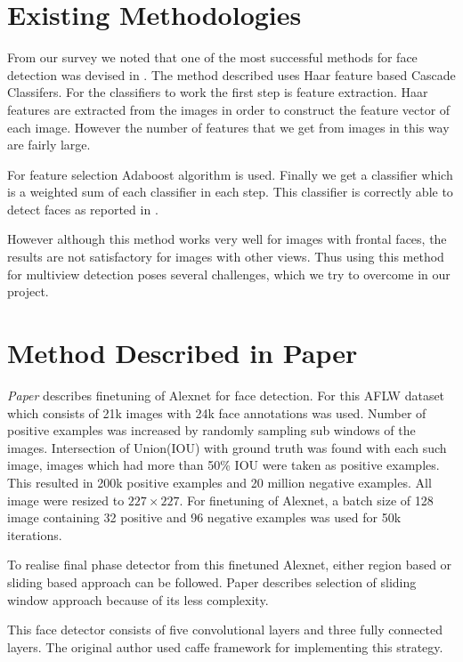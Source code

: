 \documentclass{article}
\begin{document}
\section{Existing Methodologies}
From our survey we noted that one of the most successful methods for face detection was devised in \cite{viola}. The method described uses Haar feature based Cascade Classifers. For the classifiers to work the first step is feature extraction. Haar features are extracted from the images in order to construct the feature vector of each image. However the number of features that we get from images in this way are fairly large.\par
For feature selection Adaboost algorithm is used. Finally we get a classifier which is a weighted sum of each classifier in each step. This classifier is correctly able to detect faces as reported in \cite{viola}. \par
However although this method works very well for images with frontal faces, the results are not satisfactory for images with other views. Thus using this method for multiview detection poses several challenges, which we try to overcome in our project.

\section{Method Described in Paper}
\textit{Paper} describes finetuning of Alexnet for face detection. For this AFLW dataset which consists of 21k images with 24k face annotations was used. Number of positive examples was increased by randomly sampling sub windows of the images. Intersection of Union(IOU) with ground truth was found with each such image, images which had more than 50\% IOU were taken as positive examples. This resulted in 200k positive examples and 20 million negative examples. All image were resized to $227\times227$. For finetuning of Alexnet, a batch size of 128 image containing 32 positive and 96 negative examples was used for 50k iterations.

\par
To realise final phase detector from this finetuned Alexnet, either region based or sliding based approach can be followed. Paper describes selection of sliding window approach because of its less complexity.

\par
This face detector consists of five convolutional layers and three fully connected layers. The original author used caffe framework for implementing this strategy.
\end{document}
